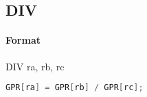 \subsection{DIV}


\paragraph{Format} DIV ra, rb, rc

\begin{lstlisting}[language=C]
    GPR[ra] = GPR[rb] / GPR[rc];
\end{lstlisting}